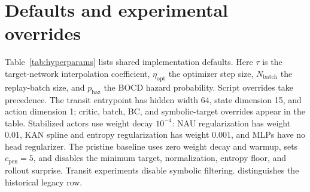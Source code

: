 \newpage
\section{Defaults and experimental overrides}
\label{app:hyperparams}

Table~\ref{tab:hyperparams} lists shared implementation defaults.
Here \(\tau\) is the target-network interpolation coefficient,
\(\eta_{\mathrm{opt}}\) the optimizer step size,
\(N_{\mathrm{batch}}\) the replay-batch size, and
\(p_{\mathrm{haz}}\) the BOCD hazard probability.
Script overrides take precedence. The transit entrypoint has hidden width
64, state dimension 15, and action dimension 1; critic, batch, BC, and
symbolic-target overrides appear in the table. Stabilized actors use weight
decay \(10^{-4}\): NAU regularization has weight \(0.01\), KAN spline and
entropy regularization has weight \(0.001\), and MLPs have no head regularizer.
The pristine baseline uses zero weight decay and warmup, sets
\(c_{\mathrm{pen}}=5\), and disables the minimum target, normalization,
entropy floor, and rollout surprise. Transit experiments disable symbolic
filtering.  distinguishes the historical legacy row.

